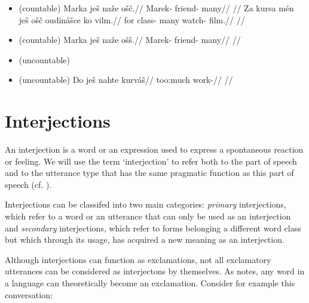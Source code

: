 \begin{itemize}
    \item {}  (countable)
    \ex
    \begingl
    \gla Marka je\v{s} na\v{z}e o\v{s}\v{c}.//
    \glb Marek-  friend- many//
    \glft {}//
    \endgl
    \xe
    \ex
    \begingl
    \gla Za kursa m\'en je\v{s} o\v{s}\v{c} oudin\'a\v{s}ce ko vilm.//
    \glb for class-   many watch-  film.//
    \glft {}//
    \endgl
    \xe
    \item {}  (countable)
    \ex
    \begingl
    \gla Marka je\v{s} na\v{z}e o\v{s}\v{s}.//
    \glb Marek-  friend- many//
    \glft {}//
    \endgl
    \xe
    \item {}  (uncountable)
    \item {}  (uncountable)
    \ex
    \begingl
    \gla Do je\v{s} nahte kurv\'a\v{s}//
    \glb {}  too:much work-//
    \glft {}//
    \endgl
    \xe

\end{itemize}

\section{Interjections}

An interjection is a word or an expression used to express a spontaneous reaction or feeling. We will use the term `interjection' to refer both to the part of speech and to the utterance type that has the same pragmatic function as this part of speech (cf. \cite{ameka1992}).

Interjections can be classifed into two main categories: \emph{primary} interjections, which refer to a word or an utterance that can only be used as an interjection and \emph{secondary} interjections, which refer to forms belonging a different word class but which through its usage, has acquired a new meaning as an interjection.

Although interjections can function as exclamations, not all exclamatory utterances can be considered as interjectons by themselves. As \textcite{jovanovic2004} notes, any word in a language can theoretically become an exclamation. Consider for example this conversation:


